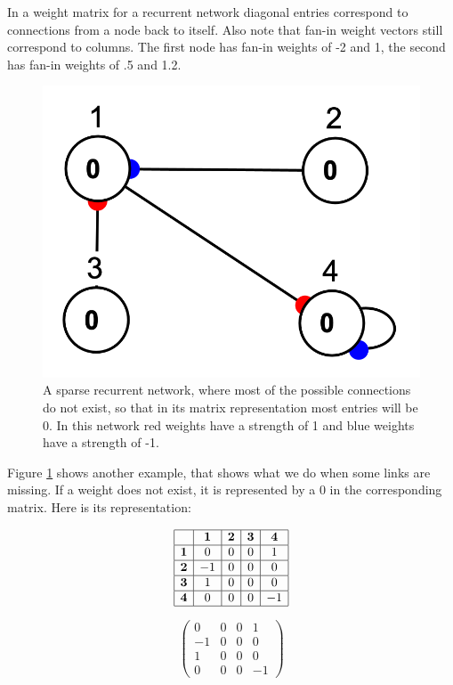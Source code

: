 \noindent In a weight matrix for a recurrent network diagonal entries correspond to connections from a node back to itself. Also note that fan-in weight vectors still correspond to columns. The first node has fan-in weights of -2 and 1, the second has fan-in weights of .5 and 1.2.

\begin{figure}[h]
\centering
\includegraphics[scale=0.5]{./images/sparseRecurrent.png}
\caption[Jeff Yoshimi.]{A sparse recurrent network, where most of the possible connections do not exist, so that in its matrix representation most entries will be 0. In this network red weights have a strength of 1 and blue weights have a strength of -1.} 
\label{sparseRecurrent}
\end{figure}

Figure \ref{sparseRecurrent} shows another example, that shows what we do when some links are missing. If a weight does not exist, it is represented by a $0$ in the corresponding matrix. Here is its representation:

\begin{minipage}{0.5\textwidth}
\centering
\[
\begin{array}{|c|c|c|c|c|}
\hline
\multicolumn{1}{|c|}{} & \textbf{1} & \textbf{2}  & \textbf{3} & \textbf{4} \\
\hline
\textbf{1} & 0 & 0 & 0 & 1 \\
\hline
\textbf{2} & -1 & 0 & 0 & 0 \\
\hline
\textbf{3} & 1 & 0 & 0 & 0 \\
\hline
\textbf{4} & 0 & 0 & 0 & -1 \\
\hline
\end{array}
\]
\end{minipage}
\begin{minipage}{0.5\textwidth}
\centering
\[
\begin{pmatrix}
0 & 0 & 0 & 1 \\
-1 & 0 & 0 & 0 \\
1 & 0 & 0 & 0 \\
0 & 0 & 0 & -1
\end{pmatrix}
\]
\end{minipage}
\vspace*{.1cm} 

